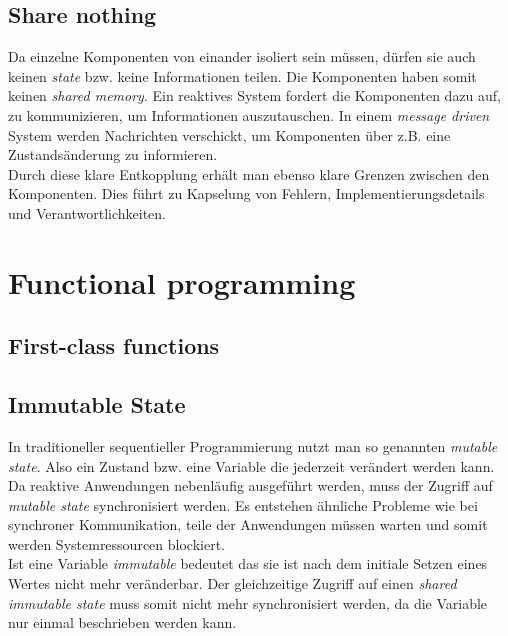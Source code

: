 
\subsection{Share nothing}
Da einzelne Komponenten von einander isoliert sein müssen, dürfen sie auch keinen \textit{state} bzw. keine Informationen teilen. Die Komponenten haben somit keinen \textit{shared memory}. Ein reaktives System fordert die Komponenten dazu auf, zu kommunizieren, um Informationen auszutauschen. In einem \textit{message driven} System werden Nachrichten verschickt, um Komponenten über z.B. eine Zustandsänderung zu informieren.\\
Durch diese klare Entkopplung erhält man ebenso klare Grenzen zwischen den Komponenten. Dies führt zu Kapselung von Fehlern, Implementierungsdetails und Verantwortlichkeiten.



\pagebreak

\section{Functional programming}

\subsection{First-class functions}
\subsection{Immutable State}
In traditioneller sequentieller Programmierung nutzt man so genannten \textit{mutable state}. Also ein Zustand bzw. eine Variable die jederzeit verändert werden kann. Da reaktive Anwendungen nebenläufig ausgeführt werden, muss der Zugriff auf \textit{mutable state} synchronisiert werden. Es entstehen ähnliche Probleme wie bei synchroner Kommunikation, teile der Anwendungen müssen warten und somit werden Systemressourcen blockiert.\\
Ist eine Variable \textit{immutable} bedeutet das sie ist nach dem initiale Setzen eines Wertes nicht mehr veränderbar. Der gleichzeitige Zugriff auf einen \textit{shared immutable state} muss somit nicht mehr synchronisiert werden, da die Variable nur einmal beschrieben werden kann.

